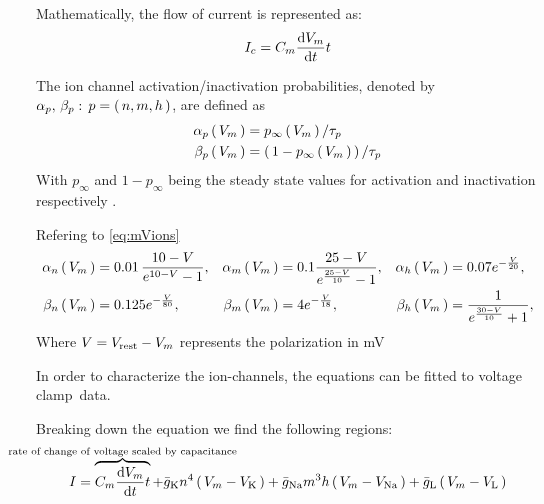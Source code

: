 \documentclass[../../Orator.tex]{subfiles}
\begin{document}
Mathematically, the flow of current is represented as:
\begin{equation}
    I_c = C_m \ode{V_m}{t}
\end{equation}



The ion channel activation/inactivation probabilities, denoted by \(\alpha_p, \, \beta_p : \, p=\br{n,m,h}\), are defined as 
\begin{align}
    \alpha_p\br{V_m} &= p_\infty \br{V_m} / \tau_p \\
    \beta_p\br{V_m}  &= \br{1 - p_\infty \br{V_m}} / \tau_p 
\end{align}
With \(p_\infty\) and \(1-p_\infty\) being the steady state values for activation and inactivation respectively \cite{}. 

Refering to \cref{eq:mVions}
\begin{align*}
    \alpha_n \br{V_m} &= 0.01 \, \frac{ 10 - V }{ e^{ 10 - V } - 1}, &
    \alpha_m \br{V_m} &= 0.1 \frac{ 25 - V }{e^{\frac{25-V}{10}} - 1}, &
    \alpha_h \br{V_m} &=  0.07 e^{-\frac{V}{20}}, \\
    \beta_n \br{V_m}  &= 0.125 e^{- \frac{V}{80}}, &
    \beta_m \br{V_m}  &= 4 e^{- \frac{V}{18}}, &
    \beta_h \br{V_m}  &= \frac{ 1 }{ e^{\frac{30 - V}{10}} + 1},
\end{align*}
Where \(V = V_{\mathrm{rest}} - V_m\) represents the polarization in \unit{\milli\volt}

In order to characterize the ion-channels, the equations can be fitted to voltage clamp\footnotemark~data.


Breaking down the equation we find the following regions:
\begin{equation*}
    I = 
    \overbrace{C_m \ode{V_m}{t}}^{\mathclap{\text{rate of change of voltage scaled by capacitance}}} + 
    \bar{g}_\rmm{K} n^4 \br{V_m - V_\rmm{K}} + 
    \bar{g}_\rmm{Na} m^3 h \br{V_m - V_\rmm{Na}}  + 
    \bar{g}_\rmm{L} \br{V_m - V_\rmm{L}} 
\end{equation*}
\end{document}
